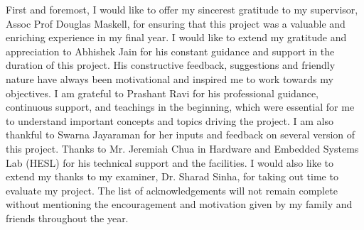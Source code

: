 First and foremost, I would like to offer my sincerest gratitude to my supervisor, Assoc Prof Douglas Maskell, for ensuring that this project was a valuable and enriching experience in my final year. \newline\newline
I would like to extend my gratitude and appreciation to Abhishek Jain for his constant guidance and support in the duration of this project. His constructive feedback, suggestions and friendly nature have always been motivational and inspired me to work towards my objectives. \newline\newline
I am grateful to Prashant Ravi for his professional guidance, continuous support, and teachings in the beginning, which were essential for me to understand important concepts and topics driving the project. I am also thankful to Swarna Jayaraman for her inputs and feedback on several version of this project. \newline \newline Thanks to Mr. Jeremiah Chua in Hardware and Embedded Systems Lab (HESL) for his technical support and the facilities.\newline\newline
I would also like to extend my thanks to my examiner, Dr. Sharad Sinha, for taking out time to evaluate my project. \newline\newline
The list of acknowledgements will not remain complete without mentioning the encouragement and motivation given by my family and friends throughout the year. \newline\newline

